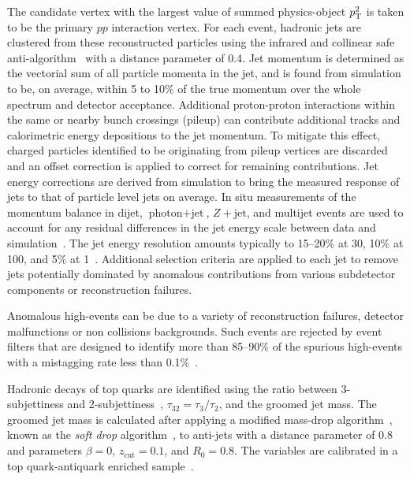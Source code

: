 The candidate vertex with the largest value of summed physics-object $p_{\mathrm{T}}^2$ is taken to be the primary $pp$ interaction vertex. For each event, hadronic jets are clustered from these reconstructed particles using the infrared and collinear safe anti-\kt algorithm~\cite{Cacciari:2008gp, Cacciari:2011ma} with a distance parameter of 0.4. Jet momentum is determined as the vectorial sum of all particle momenta in the jet, and is found from simulation to be, on average, within 5 to 10\% of the true momentum over the whole \pt spectrum and detector acceptance. Additional proton-proton interactions within the same or nearby bunch crossings (pileup) can contribute additional tracks and calorimetric energy depositions to the jet momentum. To mitigate this effect, charged particles identified to be originating from pileup vertices are discarded and an offset correction is applied to correct for remaining contributions. Jet energy corrections are derived from simulation to bring the measured response of jets to that of particle level jets on average. In situ measurements of the momentum balance in dijet, $\text{photon} + \text{jet}$, $Z + \text{jet}$, and multijet events are used to account for any residual differences in the jet energy scale between data and simulation~\cite{Khachatryan:2016kdb}. The jet energy resolution amounts typically to 15--20\% at 30\GeV, 10\% at 100\GeV, and 5\% at 1\TeV~\cite{Khachatryan:2016kdb}. Additional selection criteria are applied to each jet to remove jets potentially dominated by anomalous contributions from various subdetector components or reconstruction failures.

Anomalous high-\ptmiss events can be due to a variety of reconstruction failures, detector malfunctions or non collisions backgrounds. Such events are rejected by event filters that are designed to identify more than 85--90\% of the spurious high-\ptmiss events with a mistagging rate less than 0.1\%~\cite{Sirunyan:2019kia}.

Hadronic decays of top quarks are identified using the ratio between 3-subjettiness and 2-subjettiness~\cite{Thaler:2010tr}, $\tau_{32}=\tau_{3}/\tau_{2}$, and the groomed jet mass. The groomed jet mass is calculated after applying a modified mass-drop algorithm~\cite{Dasgupta:2013ihk,Butterworth:2008iy}, known as the \emph{soft drop} algorithm~\cite{Larkoski:2014wba}, to anti-\kt jets with a distance parameter of 0.8 and parameters $\beta=0$, $z_\text{cut}=0.1$, and $R_0 = 0.8$. The variables are calibrated in a top quark-antiquark enriched sample~\cite{Sirunyan:2020foa}.

